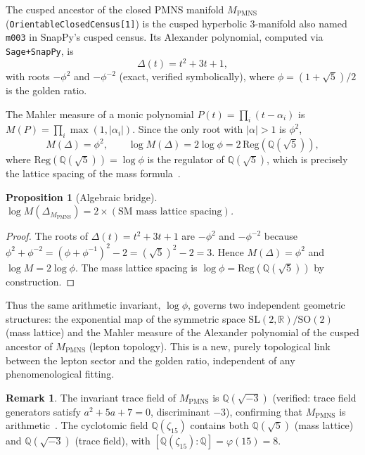﻿\documentclass[12pt]{article}
\newtheorem{proposition}[theorem]{Proposition}
\theoremstyle{definition}
\newtheorem{remark}[theorem]{Remark}
\begin{document}
The cusped ancestor of the closed PMNS manifold $M_\text{PMNS}$
(\texttt{OrientableClosedCensus[1]}) is the cusped hyperbolic 3-manifold
also named \texttt{m003} in SnapPy's cusped census.  Its Alexander
polynomial, computed via \texttt{Sage+SnapPy}, is
\[
\Delta(t) = t^2 + 3t + 1,
\]
with roots $-\phi^2$ and $-\phi^{-2}$ (exact, verified symbolically),
where $\phi = (1+\sqrt5)/2$ is the golden ratio.

The Mahler measure of a monic polynomial $P(t)=\prod_i(t-\alpha_i)$ is
$M(P)=\prod_i\max(1,|\alpha_i|)$.  Since the only root with $|\alpha|>1$
is $\phi^2$,
\[
M(\Delta) = \phi^2, \qquad
\log M(\Delta) = 2\log\phi = 2\,\mathrm{Reg}(\mathbb{Q}(\sqrt{5})),
\]
where $\mathrm{Reg}(\mathbb{Q}(\sqrt{5}))=\log\phi$ is the regulator of
$\mathbb{Q}(\sqrt{5})$, which is precisely the lattice spacing of the
mass formula~\cite{Gentry:ShapeSpace}.

\begin{proposition}[Algebraic bridge]
\label{prop:mahler}
$\log M(\Delta_{M_\text{PMNS}}) = 2 \times (\text{SM mass lattice spacing})$.
\end{proposition}

\begin{proof}
The roots of $\Delta(t)=t^2+3t+1$ are $-\phi^2$ and $-\phi^{-2}$ because
$\phi^2+\phi^{-2}=(\phi+\phi^{-1})^2-2=(\sqrt{5})^2-2=3$.
Hence $M(\Delta)=\phi^2$ and $\log M = 2\log\phi$.  The mass lattice
spacing is $\log\phi = \mathrm{Reg}(\mathbb{Q}(\sqrt{5}))$ by construction.
\end{proof}

Thus the same arithmetic invariant, $\log\phi$, governs two independent
geometric structures: the exponential map of the symmetric space
$\mathrm{SL}(2,\mathbb{R})/\mathrm{SO}(2)$ (mass lattice) and the
Mahler measure of the Alexander polynomial of the cusped ancestor of
$M_\text{PMNS}$ (lepton topology).  This is a new, purely topological
link between the lepton sector and the golden ratio, independent of any
phenomenological fitting.

\begin{remark}
The invariant trace field of $M_\text{PMNS}$ is $\mathbb{Q}(\sqrt{-3})$
(verified: trace field generators satisfy $a^2+5a+7=0$, discriminant
$-3$), confirming that $M_\text{PMNS}$ is arithmetic~\cite{Chinburg98}.
The cyclotomic field $\mathbb{Q}(\zeta_{15})$ contains both
$\mathbb{Q}(\sqrt{5})$ (mass lattice) and $\mathbb{Q}(\sqrt{-3})$
(trace field), with $[\mathbb{Q}(\zeta_{15}):\mathbb{Q}]=\varphi(15)=8$.
\end{remark}
\end{document}
